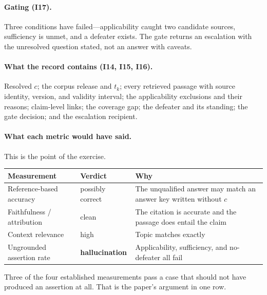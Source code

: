 \paragraph{Gating (I17).} Three conditions have failed---applicability caught two
candidate sources, sufficiency is unmet, and a defeater exists. The gate returns an
escalation with the unresolved question stated, not an answer with caveats.

\paragraph{What the record contains (I14, I15, I16).} Resolved $c$; the corpus release
and $t_k$; every retrieved passage with source identity, version, and validity interval;
the applicability exclusions and their reasons; claim-level links; the coverage gap; the
defeater and its standing; the gate decision; and the escalation recipient.

\paragraph{What each metric would have said.} This is the point of the exercise.

\begin{center}
\small
\begin{tabular}{@{}>{\raggedright\arraybackslash}p{4.3cm}>{\raggedright\arraybackslash}p{2.5cm}>{\raggedright\arraybackslash}p{6.2cm}@{}}
\toprule
Measurement & Verdict & Why \\
\midrule
Reference-based accuracy
  & possibly correct
  & The unqualified answer may match an answer key written without $c$ \\
\addlinespace
Faithfulness / attribution
  & clean
  & The citation is accurate and the passage does entail the claim \\
\addlinespace
Context relevance
  & high
  & Topic matches exactly \\
\addlinespace
Ungrounded assertion rate
  & \textbf{hallucination}
  & Applicability, sufficiency, and no-defeater all fail \\
\bottomrule
\end{tabular}
\end{center}

Three of the four established measurements pass a case that should not have produced an
assertion at all. That is the paper's argument in one row.
